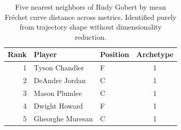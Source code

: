\begin{table}[htbp]
  \centering\small
  \begin{tabular}{rllc}
    \toprule
    Rank & Player & Position & Archetype \\
    \midrule
    1 & Tyson Chandler & F & 1 \\
    2 & DeAndre Jordan & C & 1 \\
    3 & Mason Plumlee & C & 1 \\
    4 & Dwight Howard & F & 1 \\
    5 & Gheorghe Muresan & C & 1 \\
    \bottomrule
  \end{tabular}
  \caption{Five nearest neighbors of Rudy Gobert by mean Fr\'{e}chet curve distance across metrics. Identified purely from trajectory shape without dimensionality reduction.}
  \label{tab:Rudy_Gobert_frechet_curve_neighbors}
\end{table}

